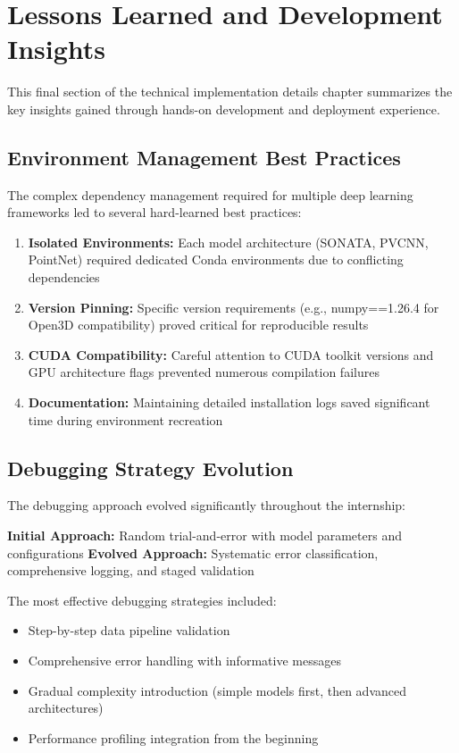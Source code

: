 \documentclass[12pt,a4paper]{report}
\begin{document}
\section{Lessons Learned and Development Insights}

This final section of the technical implementation details chapter summarizes the key insights gained through hands-on development and deployment experience.

\subsection{Environment Management Best Practices}

The complex dependency management required for multiple deep learning frameworks led to several hard-learned best practices:

\begin{enumerate}
    \item \textbf{Isolated Environments:} Each model architecture (SONATA, PVCNN, PointNet) required dedicated Conda environments due to conflicting dependencies
    \item \textbf{Version Pinning:} Specific version requirements (e.g., numpy==1.26.4 for Open3D compatibility) proved critical for reproducible results
    \item \textbf{CUDA Compatibility:} Careful attention to CUDA toolkit versions and GPU architecture flags prevented numerous compilation failures
    \item \textbf{Documentation:} Maintaining detailed installation logs saved significant time during environment recreation
\end{enumerate}

\subsection{Debugging Strategy Evolution}

The debugging approach evolved significantly throughout the internship:

\textbf{Initial Approach:} Random trial-and-error with model parameters and configurations
\textbf{Evolved Approach:} Systematic error classification, comprehensive logging, and staged validation

The most effective debugging strategies included:
\begin{itemize}
    \item Step-by-step data pipeline validation
    \item Comprehensive error handling with informative messages
    \item Gradual complexity introduction (simple models first, then advanced architectures)
    \item Performance profiling integration from the beginning
\end{itemize}
\end{document}
